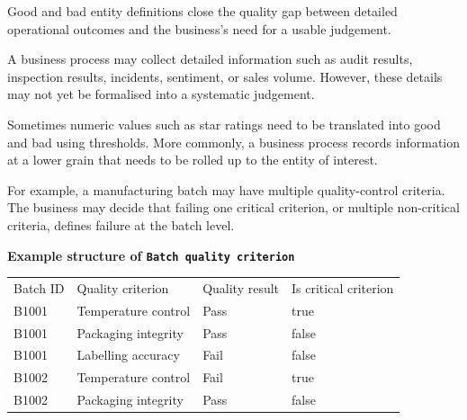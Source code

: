 \documentclass[10pt,openany,10pt]{book}
\newcounter{none}
\let\podeToprule\toprule
\let\podeMidrule\midrule
\let\podeBottomrule\bottomrule
\renewcommand{\toprule}{\arrayrulecolor{pbiGrid}\podeToprule}
\renewcommand{\midrule}{\arrayrulecolor{pbiGrid}\podeMidrule}
\renewcommand{\bottomrule}{\arrayrulecolor{pbiGrid}\podeBottomrule}
\begin{document}
Good and bad entity definitions close the quality gap between detailed
operational outcomes and the business's need for a usable judgement.

A business process may collect detailed information such as audit
results, inspection results, incidents, sentiment, or sales volume.
However, these details may not yet be formalised into a systematic
judgement.

Sometimes numeric values such as star ratings need to be translated into
good and bad using thresholds. More commonly, a business process records
information at a lower grain that needs to be rolled up to the entity of
interest.

For example, a manufacturing batch may have multiple quality-control
criteria. The business may decide that failing one critical criterion,
or multiple non-critical criteria, defines failure at the batch level.

\textbf{Example structure of
\texttt{\textquotesingle{}Batch\ quality\ criterion\textquotesingle{}}}

{\def\LTcaptype{none} %
\begin{longtable}[]{@{}
  >{\raggedright\arraybackslash}p{}
  >{\raggedright\arraybackslash}p{}
  >{\raggedright\arraybackslash}p{}
  >{\raggedright\arraybackslash}p{}@{}}
\toprule\noalign{}
\begin{minipage}[b]{\linewidth}\raggedright
Batch ID
\end{minipage} & \begin{minipage}[b]{\linewidth}\raggedright
Quality criterion
\end{minipage} & \begin{minipage}[b]{\linewidth}\raggedright
Quality result
\end{minipage} & \begin{minipage}[b]{\linewidth}\raggedright
Is critical criterion
\end{minipage} \\
\midrule\noalign{}
\endhead
\bottomrule\noalign{}
\endlastfoot
B1001 & Temperature control & Pass & true \\
B1001 & Packaging integrity & Pass & false \\
B1001 & Labelling accuracy & Fail & false \\
B1002 & Temperature control & Fail & true \\
B1002 & Packaging integrity & Pass & false \\
\end{longtable}
}
\end{document}
